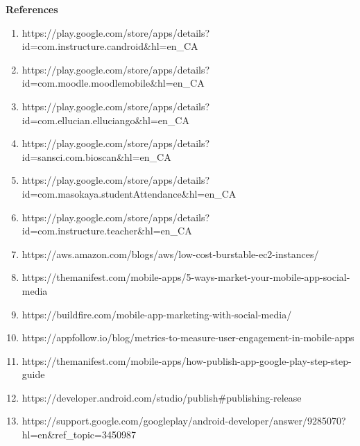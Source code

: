 \begin{titlepage}
    \begin{center}
        \Huge
        \textbf{References}
    \end{center}
    \vspace{1cm}
    \begin{enumerate}
        \item https://play.google.com/store/apps/details?id=com.instructure.candroid\&hl=en\_CA

        \item https://play.google.com/store/apps/details?id=com.moodle.moodlemobile\&hl=en\_CA
    
        \item https://play.google.com/store/apps/details?id=com.ellucian.elluciango\&hl=en\_CA
    
        \item https://play.google.com/store/apps/details?id=sansci.com.bioscan\&hl=en\_CA
    
        \item https://play.google.com/store/apps/details?id=com.masokaya.studentAttendance\&hl=en\_CA
    
        \item https://play.google.com/store/apps/details?id=com.instructure.teacher\&hl=en\_CA
        
        \item https://aws.amazon.com/blogs/aws/low-cost-burstable-ec2-instances/

        \item https://themanifest.com/mobile-apps/5-ways-market-your-mobile-app-social-media
        
        \item https://buildfire.com/mobile-app-marketing-with-social-media/

        \item https://appfollow.io/blog/metrics-to-measure-user-engagement-in-mobile-apps
        
        \item https://themanifest.com/mobile-apps/how-publish-app-google-play-step-step-guide

        \item https://developer.android.com/studio/publish\#publishing-release

        \item https://support.google.com/googleplay/android-developer/answer/9285070?hl=en\&ref\_topic=3450987


\end{enumerate}
\end{titlepage}
